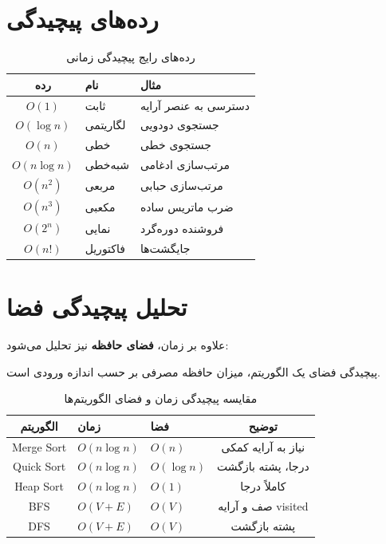 \documentclass{matinbook}
\begin{document}
    \section{رده‌های پیچیدگی}
    
    \begin{table}[h]
        \centering
        \caption{رده‌های رایج پیچیدگی زمانی}
        \label{tab:complexity-classes}
        \begin{tabular}{|c|C{4cm}|C{4cm}|}
            \hline
            \textbf{رده} & \textbf{نام} & \textbf{مثال} \\
            \hline
            $O(1)$ & ثابت & دسترسی به عنصر آرایه \\
            $O(\log n)$ & لگاریتمی & جستجوی دودویی \\
            $O(n)$ & خطی & جستجوی خطی \\
            $O(n \log n)$ & شبه‌خطی & مرتب‌سازی ادغامی \\
            $O(n^{2})$ & مربعی & مرتب‌سازی حبابی \\
            $O(n^{3})$ & مکعبی & ضرب ماتریس ساده \\
            $O(2^{n})$ & نمایی & فروشنده دوره‌گرد \\
            $O(n!)$ & فاکتوریل & جایگشت‌ها \\
            \hline
        \end{tabular}
    \end{table}
    
    \section{تحلیل پیچیدگی فضا}
    
    علاوه بر زمان، \textbf{فضای حافظه}
    نیز تحلیل می‌شود:
    
    \begin{definition}
        پیچیدگی فضای یک الگوریتم، میزان حافظه
        مصرفی بر حسب اندازه ورودی است.
        \label{def:space-complexity}
    \end{definition}
    
    \begin{table}[h]
        \centering
        \caption{مقایسه پیچیدگی زمان و فضای الگوریتم‌ها}
        \label{tab:time-space}
        \begin{tabular}{|c|C{3cm}|C{3cm}|c|}
            \hline
            \textbf{الگوریتم} & \textbf{زمان} & \textbf{فضا} & \textbf{توضیح} \\
            \hline
            Merge Sort & $O(n \log n)$ & $O(n)$ & نیاز به آرایه کمکی \\
            Quick Sort & $O(n \log n)$ & $O(\log n)$ & درجا، پشته بازگشت \\
            Heap Sort & $O(n \log n)$ & $O(1)$ & کاملاً درجا \\
            BFS & $O(V+E)$ & $O(V)$ & صف و آرایه visited \\
            DFS & $O(V+E)$ & $O(V)$ & پشته بازگشت \\
            \hline
        \end{tabular}
    \end{table}
    
\end{document}
